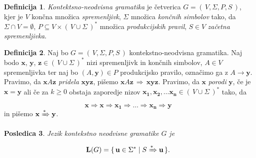 \documentclass{amsart}
\theoremstyle{definition} %
\newtheorem{definicija}{Definicija}[section]
\theoremstyle{plain} %
\newtheorem{posledica}[definicija]{Posledica}
\begin{document}
\begin{definicija}

    \textit{Kontektsno-neodvisna gramatika} je četverica $ G = (\, V, \Sigma, P, S \,) $, kjer je
    $ V $ končna množica \textit{spremenljivk}, $ \Sigma $ množica \textit{končnih simbolov} tako,
    da $ \Sigma \cap V = \emptyset $, $ P \subseteq V \times (\, V \cup \Sigma \,)^* $ množica 
    \textit{produkcijskih pravil}, $ S \in V $ \textit{začetna spremenljivka}.

\end{definicija}


\begin{definicija}
    
    Naj bo $ G = (\, V, \Sigma, P, S \,) $ kontekstno-neodvisna gramatika. Naj bodo $ \mathbf{x} $,
    $ \mathbf{y} $, $ \mathbf{z} \in (\, V \cup \Sigma \,)^* $ nizi spremenljivk in končnih simbolov,
    $ A \in V $ spremenljivka ter naj bo $ ( A, \mathbf{y} ) \in P $ produkcijsko pravilo,
    označimo ga z $ A \rightarrow \mathbf{y} $. Pravimo, da $ \mathbf{x}A\mathbf{z} $ 
    \textit{pridela} $ \mathbf{x}\mathbf{y}\mathbf{z} $, pišemo
    $ \mathbf{x}A\mathbf{z} \, \Rightarrow \, \mathbf{x}\mathbf{y}\mathbf{z} $. Pravimo, da
    $ \mathbf{x} $ \textit{porodi} $ \mathbf{y} $, če je $ \mathbf{x} = \mathbf{y} $ ali če
    za $ k \geq 0 $ obstaja zaporedje nizov $ \mathbf{x_1}, \mathbf{x_2}, \ldots \mathbf{x_n}
    \in (\, V \cup \Sigma \,)^* $ tako, da 

    \begin{equation*}
        \mathbf{x} \Rightarrow \mathbf{x} \Rightarrow \mathbf{x_1} \Rightarrow \ldots \Rightarrow \mathbf{x_n}
        \Rightarrow \mathbf{y}
    \end{equation*}
    in pišemo $ \mathbf{x} \xRightarrow{*} \mathbf{y} $.

\end{definicija}

\begin{posledica}

    Jezik kontekstno neodvisne gramatike $ G $ je 

    \begin{equation*}
        \mathbf{L}(G) = \{\, \mathbf{u} \in \Sigma^* \mid S \xRightarrow{*} \mathbf{u} \,\}.
    \end{equation*}

\end{posledica}
\end{document}
